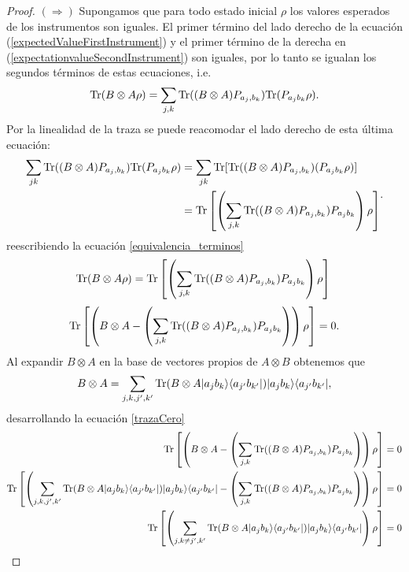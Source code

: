 \begin{proof}
    $(\Rightarrow)$ Supongamos que para todo estado inicial $\rho$ los valores esperados de los instrumentos son iguales. El primer término del lado derecho de la ecuación ({\ref{expectedValueFirstInstrument}}) y el primer término de la derecha en ({\ref{expectationvalueSecondInstrument}}) son iguales, por lo tanto se igualan los segundos términos de estas ecuaciones, i.e.\begin{equation}\label{equivalencia_terminos}{\rm Tr}(B\otimes A \rho)=\sum_{j,k}{\rm Tr}((B\otimes A) P_{a_j,b_k}){\rm Tr}(P_{a_j b_k}\rho ).\end{equation} Por la linealidad de la traza se puede reacomodar el lado derecho de esta última ecuación: \[\begin{split}\sum_{jk}{\rm Tr}((B\otimes A) P_{a_j,b_k}){\rm Tr}(P_{a_j b_k}\rho )&= \sum_{jk}{\rm Tr}[{\rm Tr}((B\otimes A) P_{a_j,b_k})(P_{a_j b_k}\rho )]\\
        &={\rm Tr}\left[\left(\sum_{j,k}{\rm Tr}((B\otimes A) P_{a_j,b_k})P_{a_j b_k}\right)\rho \right]\end{split}.\]  reescribiendo la ecuación {\ref{equivalencia_terminos}} 
        \[{\rm Tr}(B\otimes A \rho)={\rm Tr}\left[\left(\sum_{j,k}{\rm Tr}((B\otimes A) P_{a_j,b_k})P_{a_j b_k}\right)\rho \right]\\ \]
    \begin{equation}\label{trazaCero}\begin{split}
        {\rm Tr}\left[\left(B\otimes A-\left(\sum_{j,k}{\rm Tr}((B\otimes A) P_{a_j,b_k})P_{a_j b_k}\right)\right)\rho \right]=0\\ \end{split}.\end{equation}
        Al expandir $B\otimes A$ en la base de vectores propios de $A\otimes B$ obtenemos que \[B\otimes A=\sum_{j,k,j',k'}{\rm Tr}(B\otimes A |a_j b_k\rangle \langle a_{j'}b_{k'}|)|a_j b_k\rangle \langle a_{j'}b_{k'}|,\] desarrollando la ecuación {\ref{trazaCero}}   
    \[\begin{split}
        \tr\left[\left(B\otimes A-\left(\sum_{j,k}\tr((B\otimes A) P_{a_j,b_k})P_{a_j b_k}\right)\right)\rho\right]&=0\\
    \tr\left[\left(\sum_{j,k,j',k'}\tr(B\otimes A |a_j b_k\rala a_{j'}b_{k'}|)|a_j b_k\rala a_{j'}b_{k'}|-\left(\sum_{j,k}\tr((B\otimes A) P_{a_j,b_k})P_{a_j b_k}\right)\right)\rho\right]&=0\\
    \tr\left[\left(\sum_{j,k\ne j',k'}\tr(B\otimes A |a_j b_k\rala a_{j'}b_{k'}|)|a_j b_k\rala a_{j'}b_{k'}|\right)\rho\right]&=0\\

\end{split}\]
\end{proof}
